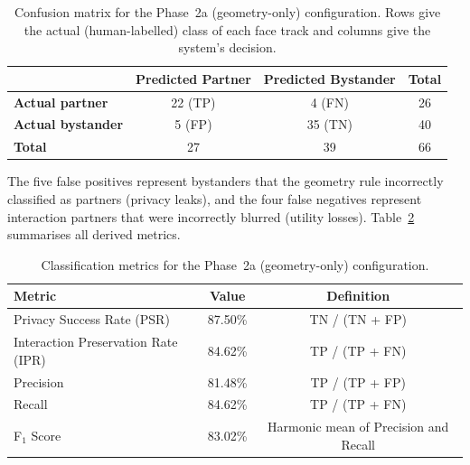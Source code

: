 \begin{table}[htbp]
\begin{singlespace}
\centering
\caption{Confusion matrix for the Phase~2a (geometry-only) configuration. Rows give
the actual (human-labelled) class of each face track and columns give the system's
decision.}
\label{tab:confusion_2a}
\renewcommand{\arraystretch}{1.3}
\begin{tabular}{@{}lccc@{}}
\toprule
 & \textbf{Predicted Partner} & \textbf{Predicted Bystander} & \textbf{Total} \\
\midrule
\textbf{Actual partner}   & 22 (TP) & 4 (FN) & 26 \\
\textbf{Actual bystander} & 5 (FP)  & 35 (TN) & 40 \\
\textbf{Total}        & 27      & 39      & 66 \\
\bottomrule
\end{tabular}
\end{singlespace}
\end{table}

The five false positives represent bystanders that the geometry rule incorrectly
classified as partners (privacy leaks), and the four false negatives represent
interaction partners that were incorrectly blurred (utility losses).
Table~\ref{tab:metrics_2a} summarises all derived metrics.

\begin{table}[htbp]
\begin{singlespace}
\centering
\caption{Classification metrics for the Phase~2a (geometry-only) configuration.}
\label{tab:metrics_2a}
\renewcommand{\arraystretch}{1.3}
\begin{tabular}{@{}lcc@{}}
\toprule
\textbf{Metric} & \textbf{Value} & \textbf{Definition} \\
\midrule
Privacy Success Rate (PSR)          & 87.50\% & TN / (TN + FP) \\
Interaction Preservation Rate (IPR) & 84.62\% & TP / (TP + FN) \\
Precision                           & 81.48\% & TP / (TP + FP) \\
Recall                              & 84.62\% & TP / (TP + FN) \\
F$_1$ Score                         & 83.02\% & Harmonic mean of Precision and Recall \\
\bottomrule
\end{tabular}
\end{singlespace}
\end{table}

